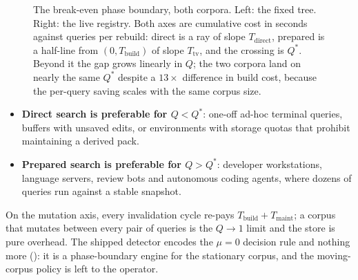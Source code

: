 \documentclass[11pt,letterpaper]{article}
\begin{document}
\begin{figure}[t]
\begin{minipage}[t]{0.48\textwidth}
\end{minipage}
\caption{The break-even phase boundary, both corpora. Left: the fixed tree.
Right: the live registry. Both axes are cumulative cost in seconds against
queries per rebuild: direct is a ray of slope $T_{\text{direct}}$,
prepared is a half-line from $(0,T_{\text{build}})$ of slope
$T_{\text{tv}}$, and the crossing is $Q^{*}$. Beyond it the gap grows
linearly in $Q$; the two corpora land on nearly the same $Q^{*}$ despite a
$13\times$ difference in build cost, because the per-query saving scales
with the same corpus size.}
\label{fig:phase}
\end{figure}

\begin{itemize}[leftmargin=*,itemsep=1pt]
\item \textbf{Direct search is preferable for $Q<Q^{*}$}: one-off ad-hoc
  terminal queries, buffers with unsaved edits, or environments with storage
  quotas that prohibit maintaining a derived pack.
\item \textbf{Prepared search is preferable for $Q>Q^{*}$}: developer
  workstations, language servers, review bots and autonomous coding agents,
  where dozens of queries run against a stable snapshot.
\end{itemize}

On the mutation axis, every invalidation cycle re-pays
$T_{\text{build}}+T_{\text{maint}}$; a corpus that mutates between every
pair of queries is the $Q\to 1$ limit and the store is pure overhead. The
shipped detector encodes the $\mu=0$ decision rule and nothing more
(): it is a phase-boundary engine for the stationary
corpus, and the moving-corpus policy is left to the operator.
\end{document}
